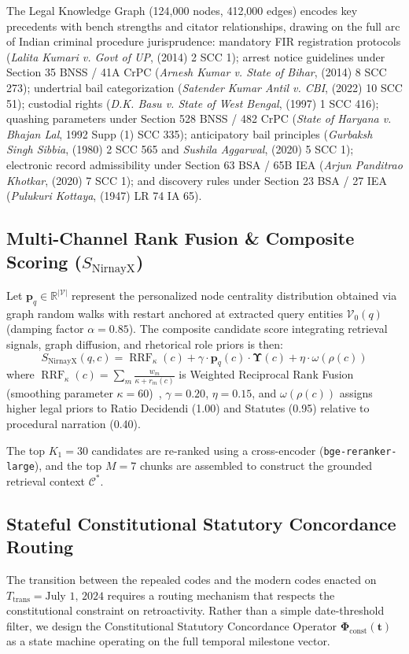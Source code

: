 \documentclass[conference]{IEEEtran}
\begin{document}
The Legal Knowledge Graph (124,000 nodes, 412,000 edges) encodes key precedents with bench strengths and citator relationships, drawing on the full arc of Indian criminal procedure jurisprudence: mandatory FIR registration protocols (\textit{Lalita Kumari v. Govt of UP}, (2014) 2 SCC 1); arrest notice guidelines under Section 35 BNSS / 41A CrPC (\textit{Arnesh Kumar v. State of Bihar}, (2014) 8 SCC 273); undertrial bail categorization (\textit{Satender Kumar Antil v. CBI}, (2022) 10 SCC 51); custodial rights (\textit{D.K. Basu v. State of West Bengal}, (1997) 1 SCC 416); quashing parameters under Section 528 BNSS / 482 CrPC (\textit{State of Haryana v. Bhajan Lal}, 1992 Supp (1) SCC 335); anticipatory bail principles (\textit{Gurbaksh Singh Sibbia}, (1980) 2 SCC 565 and \textit{Sushila Aggarwal}, (2020) 5 SCC 1); electronic record admissibility under Section 63 BSA / 65B IEA (\textit{Arjun Panditrao Khotkar}, (2020) 7 SCC 1); and discovery rules under Section 23 BSA / 27 IEA (\textit{Pulukuri Kottaya}, (1947) LR 74 IA 65).

\subsection{Multi-Channel Rank Fusion \& Composite Scoring ($S_{\text{NirnayX}}$)}
Let $\mathbf{p}_q \in \mathbb{R}^{|\mathcal{V}|}$ represent the personalized node centrality distribution obtained via graph random walks with restart anchored at extracted query entities $\mathcal{V}_0(q)$ (damping factor $\alpha = 0.85$). The composite candidate score integrating retrieval signals, graph diffusion, and rhetorical role priors is then:
\begin{equation}
S_{\text{NirnayX}}(q, c) = \operatorname{RRF}_{\kappa}(c) + \gamma \cdot \mathbf{p}_q(c) \cdot \mathbf{\Upsilon}(c) + \eta \cdot \omega(\rho(c))
\end{equation}
where $\operatorname{RRF}_{\kappa}(c) = \sum_{m} \frac{w_m}{\kappa + r_m(c)}$ is Weighted Reciprocal Rank Fusion (smoothing parameter $\kappa = 60$)~\cite{cormack2009reciprocal}, $\gamma = 0.20$, $\eta = 0.15$, and $\omega(\rho(c))$ assigns higher legal priors to Ratio Decidendi (1.00) and Statutes (0.95) relative to procedural narration (0.40).

The top $K_1 = 30$ candidates are re-ranked using a cross-encoder (\texttt{bge-reranker-large}), and the top $M = 7$ chunks are assembled to construct the grounded retrieval context $\mathcal{C}^*$.

\subsection{Stateful Constitutional Statutory Concordance Routing}
The transition between the repealed codes and the modern codes enacted on $T_{\text{trans}} = \text{July 1, 2024}$ requires a routing mechanism that respects the constitutional constraint on retroactivity. Rather than a simple date-threshold filter, we design the Constitutional Statutory Concordance Operator $\mathbf{\Phi}_{\text{const}}(\mathbf{t})$ as a state machine operating on the full temporal milestone vector.
\end{document}
